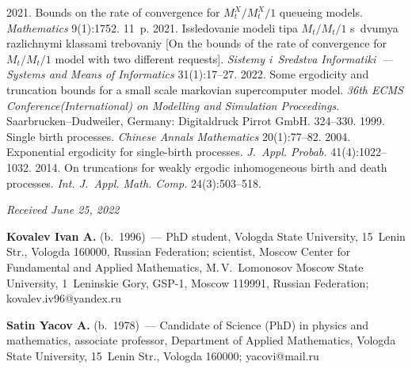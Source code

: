 \begin{multicols}{2}
{{\begin{thebibliography}{99}
 2021. Bounds on the rate of convergence for $ M_t^X/M_t^X/1$ queueing models.
 \textit{Mathematics} 9(1):1752. 11~p.
 2021. Issledovanie modeli tipa $M_t/M_t/1$ s~dvumya razlichnymi klassami trebovaniy 
[On the bounds of the rate of convergence for $M_t/M_t/1$ model with two different requests].
 \textit{Sistemy i~Sredstva Informatiki~--- Systems and Means of Informatics} 31(1):17--27.
 2022. Some ergodicity and truncation bounds for a small scale markovian supercomputer model.
\textit{36th ECMS  Conference\linebreak (International) on Modelling and 
Simulation Proceedings}. Saarbrucken--Dudweiler, Germany: Digitaldruck Pirrot 
GmbH. 324--330.
 1999. Single birth processes.  \textit{Chinese Annals Mathematics} 20(1):77--82.
 2004. Exponential ergodicity for single-birth processes.  \textit{J.~Appl. Probab.} 41(4):1022--1032.
 2014. On truncations for weakly ergodic inhomogeneous birth and death processes.  \textit{Int. J.~Appl. Math. Comp.} 24(3):503--518.
 \end{thebibliography}

 }
 }

\end{multicols}

\vspace*{-7.5pt}

\hfill{\small\textit{Received June 25, 2022}}

\vspace*{-22pt}


 \Contr
 
 \vspace*{-4pt}
 
 \noindent
 \textbf{Kovalev Ivan A.} (b.\ 1996)~--- 
 PhD student, Vologda State University, 15~Lenin Str., Vologda 160000, Russian Federation; 
 scientist, Moscow Center for Fundamental and Applied Mathematics, M.\,V.~Lomonosov Moscow State University, 
 1~Leninskie Gory, GSP-1, Moscow 119991, Russian Federation; \mbox{kovalev.iv96@yandex.ru}
 
 \vspace*{1.5pt}
 
 \noindent
 \textbf{Satin Yacov A.} (b.\ 1978)~--- 
 Candidate of Science (PhD) in physics and mathematics, associate professor, Department of Applied Mathematics, Vologda State University, 
 15~Lenin Str., Vologda 160000; \mbox{yacovi@mail.ru} 
 
